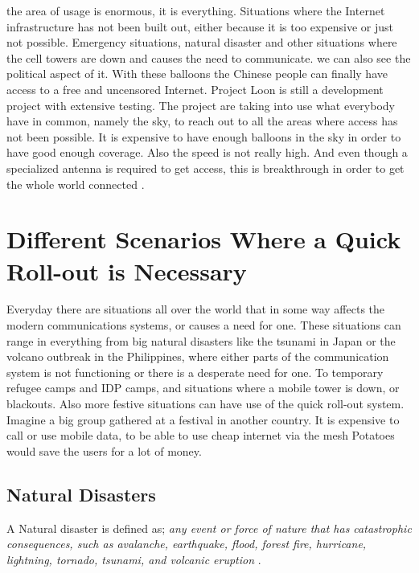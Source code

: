 the area of usage is enormous, it is everything. Situations where the Internet infrastructure has not been built out, either because it is too expensive or just not possible. Emergency situations, natural disaster and other situations where the cell towers are down and causes the need to communicate. we can also see the political aspect of it. With these balloons the Chinese people can finally have access to a free and uncensored Internet. Project Loon is still a development project with extensive testing. The project are taking into use what everybody have in common, namely the sky, to reach out to all the areas where access has not been possible. It is expensive to have enough balloons in the sky in order to have good enough coverage. Also the speed is not really high. And even though a specialized antenna is required to get access, this is breakthrough in order to get the whole world connected \cite{loonYouTube, loonNorsk}.
 
\section{Different Scenarios Where a Quick Roll-out is Necessary}

Everyday there are situations all over the world that in some way affects the modern communications systems, or causes a need for one. These situations can range in everything from big natural disasters like the tsunami in Japan or the volcano outbreak in the Philippines, where either parts of the communication system is not functioning or there is a desperate need for one. To temporary refugee camps and IDP camps, and situations where a mobile tower is down, or blackouts. Also more festive situations can have use of the quick roll-out system. Imagine a big group gathered at a festival in another country. It is expensive to call or use mobile data, to be able to use cheap internet via the mesh Potatoes would save the users for a lot of money. 

\subsection{Natural Disasters}
A Natural disaster is defined as; \textit{any event or force of nature that has catastrophic consequences, such as avalanche, earthquake, flood, forest fire, hurricane, lightning, tornado, tsunami, and volcanic eruption} \cite{naturalDisaster}.

